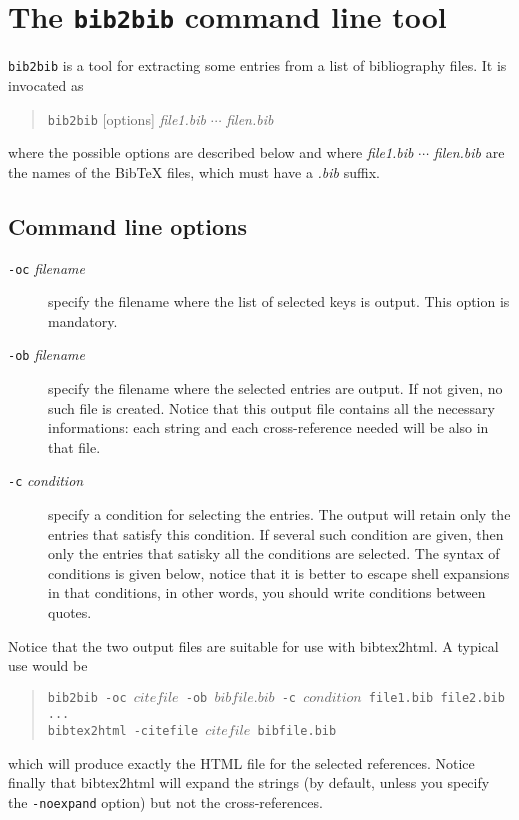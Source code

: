 \documentclass[11pt,a4paper]{article}
\begin{document}
\section{The \texttt{bib2bib} command line tool}

\texttt{bib2bib} is a tool for extracting some entries from a list of
bibliography files. It is invocated as 
\begin{quote}
\texttt{bib2bib} [options] \textit{file1.bib} $\cdots$ \textit{filen.bib}
\end{quote}
where the possible 
options
are described below and where
\textit{file1.bib} $\cdots$ \textit{filen.bib} are the names of the
BibTeX files, which must have a \textit{.bib} suffix.

\subsection{Command line options}

\begin{description}
  
\item[\texttt{-oc} \textit{filename}]
  specify the filename where the list of selected keys is output. This
  option is mandatory.

\item[\texttt{-ob} \textit{filename}]
  specify the filename where the selected entries are output. If not
  given, no such file is created. Notice that this output file
  contains all the necessary informations: each string and each
  cross-reference needed will be also in that file.

\item[\texttt{-c} \textit{condition}]
  specify a condition for selecting the entries. The output will
  retain only the entries that satisfy this condition. If several such
  condition are given, then only the entries that satisky all the
  conditions are selected. The syntax of conditions is given below,
  notice that it is better to escape shell expansions in that
  conditions, in other words, you should write conditions between
  quotes. 

\end{description}

Notice that the two output files are suitable for use with
bibtex2html.  A typical use would be
\begin{quote}
\texttt{bib2bib -oc $citefile$ -ob $bibfile.bib$ -c $condition$
  file1.bib file2.bib ... } \\
\texttt{bibtex2html -citefile $citefile$ bibfile.bib}
\end{quote}
which will produce exactly the HTML file for the selected
references. Notice finally that bibtex2html will expand the strings
(by default, unless you specify the \verb|-noexpand| option) but not
the cross-references.
\end{document}
